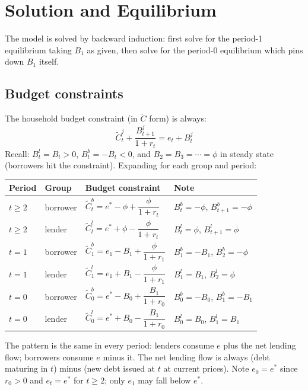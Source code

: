 \documentclass[11pt,a4paper]{article}
\renewcommand{\arraystretch}{1.15}
\begin{document}
\section{Solution and Equilibrium}\label{sec:equilibrium}

The model is solved by backward induction: first solve for the period-1 equilibrium taking $B_1$ as given, then solve for the period-0 equilibrium which pins down $B_1$ itself.

\subsection{Budget constraints}

The household budget constraint (in $\tilde{C}$ form) is always:
\begin{equation}
\tilde{C}_t^j + \frac{B_{t+1}^j}{1+r_t} = e_t + B_t^j
\end{equation}
Recall: $B_t^l = B_t > 0$, $B_t^b = -B_t < 0$, and $B_2 = B_3 = \cdots = \phi$ in steady state (borrowers hit the constraint). Expanding for each group and period:

\begin{center}
\renewcommand{\arraystretch}{1.6}
\begin{tabular}{llll}
\toprule
Period & Group & Budget constraint & Note \\
\midrule
$t \geq 2$ & borrower & $\tilde{C}_t^b = e^* - \phi + \dfrac{\phi}{1+r_t}$ & $B_t^b=-\phi$, $B_{t+1}^b=-\phi$ \\
$t \geq 2$ & lender   & $\tilde{C}_t^l = e^* + \phi - \dfrac{\phi}{1+r_t}$ & $B_t^l=\phi$, $B_{t+1}^l=\phi$ \\
\midrule
$t = 1$ & borrower & $\tilde{C}_1^b = e_1 - B_1 + \dfrac{\phi}{1+r_1}$ & $B_1^b=-B_1$, $B_2^b=-\phi$ \\
$t = 1$ & lender   & $\tilde{C}_1^l = e_1 + B_1 - \dfrac{\phi}{1+r_1}$ & $B_1^l=B_1$, $B_2^l=\phi$ \\
\midrule
$t = 0$ & borrower & $\tilde{C}_0^b = e^* - B_0 + \dfrac{B_1}{1+r_0}$ & $B_0^b=-B_0$, $B_1^b=-B_1$ \\
$t = 0$ & lender   & $\tilde{C}_0^l = e^* + B_0 - \dfrac{B_1}{1+r_0}$ & $B_0^l=B_0$, $B_1^l=B_1$ \\
\bottomrule
\end{tabular}
\end{center}

The pattern is the same in every period: lenders consume $e$ plus the net lending flow; borrowers consume $e$ minus it. The net lending flow is always (debt maturing in $t$) minus (new debt issued at $t$ at current prices). Note $e_0 = e^*$ since $r_0 > 0$ and $e_t = e^*$ for $t \geq 2$; only $e_1$ may fall below $e^*$.
\end{document}
